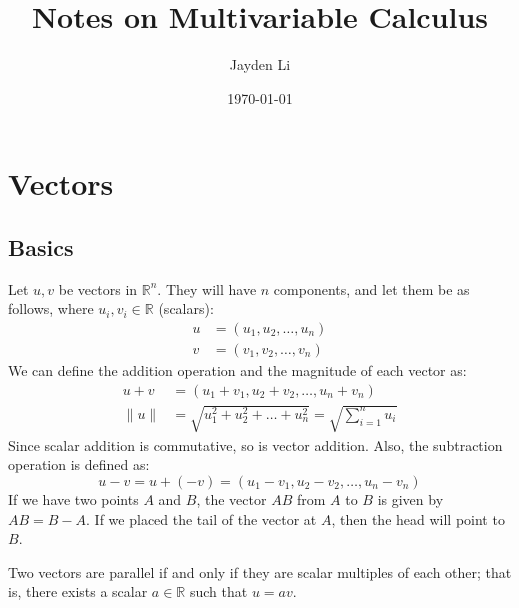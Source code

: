 \documentclass{article}
\title{\vspace*{-40pt}Notes on Multivariable Calculus}
\author{Jayden Li}
\date{\today}
\begin{document}
\fontsize{11pt}{12pt}\selectfont
\setlength{\abovedisplayskip}{\abovedisplayskip/2}
\setlength{\belowdisplayskip}{\belowdisplayskip/2}
\setlength{\parindent}{0pt}
\setlength{\parskip}{2ex plus 0.5ex minus 0.2ex}
\maketitle

\section{Vectors}

\subsection{Basics}

Let $u,v$ be vectors in $\mathbb R^n$. They will have $n$ components, and let them be as follows, where $u_i,v_i\in\mathbb R$ (scalars):
\begin{align*}
	u&=(u_1,u_2,\ldots,u_n) \\
	v&=(v_1,v_2,\ldots,v_n)
\end{align*}
We can define the addition operation and the magnitude of each vector as:
\begin{align*}
	u+v&=(u_1+v_1,u_2+v_2,\ldots,u_n+v_n) \\
	\lVert u \rVert &=\sqrt{u_1^2+u_2^2+\ldots+u_n^2}=\sqrt{\sum_{i=1}^{n}u_i}
\end{align*}
Since scalar addition is commutative, so is vector addition. Also, the subtraction operation is defined as:
\begin{equation*}
    u-v=u+(-v)=(u_1-v_1,u_2-v_2,\ldots,u_n-v_n)
\end{equation*}
If we have two points $A$ and $B$, the vector $AB$ from $A$ to $B$ is given by $AB=B-A$. If we placed the tail of the vector at $A$, then the head will point to $B$.

Two vectors are parallel if and only if they are scalar multiples of each other; that is, there exists a scalar $a\in\mathbb R$ such that $u=av$.
\end{document}

